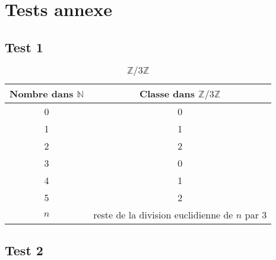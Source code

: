 \documentclass[12pt,a4paper]{article}
\begin{document}
\section{Tests annexe}
\subsection{Test 1}
\begin{table}[h]
	\centering
	\begin{tabular}{|c | c|}
		\hline \textbf{Nombre dans $\mathbb{N}$} & \textbf{Classe dans $\mathbb{Z}/3\mathbb{Z}$} \\
		\hline 0 & 0 \\
	        \hline 1 & 1 \\
		\hline 2 & 2 \\
		\hline 3 & 0 \\
		\hline 4 & 1 \\
		\hline 5 & 2 \\
		\hline $n$ & reste de la division euclidienne de $n$ par 3 \\
		\hline
	\end{tabular}
	\caption{$\mathbb{Z}/3\mathbb{Z}$}
\end{table}
\subsection{Test 2}
\begin{latex}
\usepackage[Brest, version]{telecom}
\end{latex}

\TBindex
{}
\TBglossary

\TBcoverpage
\end{document}

